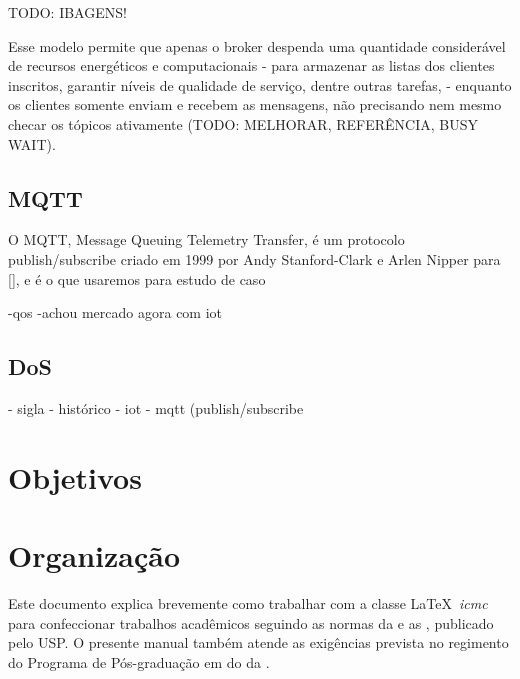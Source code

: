 TODO: IBAGENS!

Esse modelo permite que apenas o broker despenda uma quantidade considerável de recursos energéticos e computacionais \-- para armazenar as listas dos clientes inscritos, garantir níveis de qualidade de serviço, dentre outras tarefas, \-- enquanto os clientes somente enviam e recebem as mensagens, não precisando nem mesmo checar os tópicos ativamente (TODO: MELHORAR, REFERÊNCIA, BUSY WAIT).


\subsection{MQTT}
O MQTT, Message Queuing Telemetry Transfer, é um protocolo publish/subscribe criado em 1999 por Andy Stanford-Clark e Arlen Nipper para [], e é o que usaremos para estudo de caso

-qos
-achou mercado agora com iot


\subsection{DoS}
- sigla
- histórico
- iot
- mqtt (publish/subscribe



\section{Objetivos}



\section{Organização}



\newcommand{\comando}[1]{\textbf{$\backslash$#1}}

Este documento explica brevemente como trabalhar com a classe \LaTeX~\textit{icmc} para confeccionar trabalhos acadêmicos seguindo as normas da  e as , publicado pelo  USP. O presente manual também atende as exigências prevista no regimento do Programa de Pós-graduação em  do  da .


